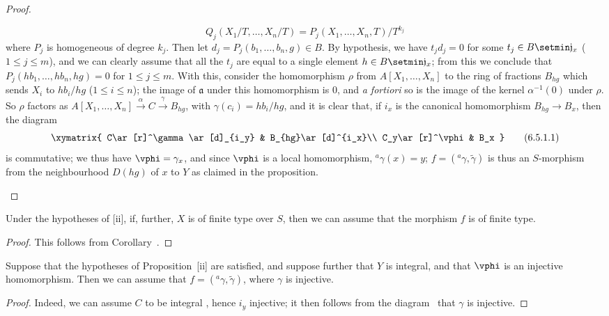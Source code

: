 \begin{proof}
\begin{enumerate}
    \[
      Q_j(X_1/T,\ldots,X_n/T)=P_j(X_1,\ldots,X_n,T)/T^{k_j}
    \]
    where $P_j$ is homogeneous of degree $k_j$.
    Then let $d_j=P_j(b_1,\ldots,b_n,g)\in B$.
    By hypothesis, we have $t_jd_j=0$ for some $t_j\in B\setmin\mathfrak{j}_x$ ($1\leq j\leq m$), and we can clearly assume that all the $t_j$
    are equal to a single element $h\in B\setmin\mathfrak{j}_x$;
    from this we conclude that $P_j(hb_1,\ldots,hb_n,hg)=0$ for $1\leq j\leq m$.
    With this, consider the homomorphism $\rho$ from $A[X_1,\ldots,X_n]$ to the ring of fractions $B_{hg}$ which sends $X_i$ to $hb_i/hg$ ($1\leq i\leq n$);
    the image of $\mathfrak{a}$ under this homomorphism is $0$, and \emph{a fortiori} so is the image of the kernel $\alpha^{-1}(0)$ under $\rho$.
    So $\rho$ factors as $A[X_1,\ldots,X_n]\xrightarrow{\alpha}C\xrightarrow{\gamma}B_{hg}$, with $\gamma(c_i)=hb_i/hg$, and it is clear that, if $i_x$ is the canonical homomorphism $B_{hg}\to B_x$, then the diagram
    \[
    \label{I.6.5.1.1}
      \xymatrix{
        C\ar[r]^\gamma\ar[d]_{i_y} &
        B_{hg}\ar[d]^{i_x}\\
        C_y\ar[r]^\vphi &
        B_x
      }
      \tag{6.5.1.1}
    \]
    is commutative; we thus have $\vphi=\gamma_x$, and since $\vphi$ is a local homomorphism, $^a\gamma(x)=y$;
    $f=({}^a\gamma,\widetilde{\gamma})$ is thus an $S$-morphism from the neighbourhood $D(hg)$ of $x$ to $Y$ as claimed in the proposition.
\end{enumerate}
\end{proof}

\begin{corollary}[6.5.2]
\label{I.6.5.2}
Under the hypotheses of [ii], if, further, $X$ is of finite type over $S$, then we can assume that the morphism $f$ is of finite type.
\end{corollary}

\begin{proof}
This follows from Corollary~.
\end{proof}

\begin{corollary}[6.5.3]
\label{I.6.5.3}
Suppose that the hypotheses of Proposition~[ii] are satisfied, and suppose further that $Y$ is integral, and that $\vphi$ is an injective homomorphism.
Then we can assume that $f=({}^a\gamma,\widetilde{\gamma})$, where $\gamma$ is injective.
\end{corollary}

\begin{proof}
Indeed, we can assume $C$ to be integral , hence $i_y$ injective; it then follows from the diagram~ that $\gamma$ is injective.
\end{proof}

